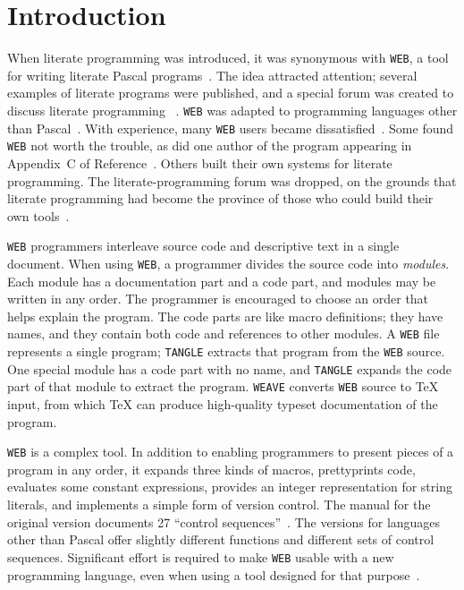 \section{Introduction}
When literate programming was
introduced, it was synonymous with {\tt WEB}, a tool
for writing literate Pascal programs~\cite[Chapter~4]{knuth:literate:book}.
The idea attracted attention; several examples of literate
programs were published, and a special forum was created to discuss literate
programming~%
\cite{denning:announcing,gries:pearls,knuth:literate:book,thimbleby:review}.
{\tt WEB} was  adapted to programming languages other than
Pascal~\cite{guntermann:cweb,levy:cweb,ramsey:building,sewell:mangle,thimbleby:cweb}.
%
With experience, many {\tt WEB} users became dissatisfied~\cite{ramsey:literate}. 
Some found {\tt WEB} not worth the trouble, as did
one author of the program appearing in Appendix~C
of Reference~.
Others built their own systems for literate
 programming.  %
The literate-programming forum was dropped, on the grounds that
literate programming had become the province of those who could build
their own tools~\cite{cvw:assessment}.

{\tt WEB}  programmers
 interleave source code and descriptive text in a single document.
When using {\tt WEB}, a programmer divides the source code into
{\em modules}.
Each module has a documentation part and a code part, and
modules may be written in any order.
The programmer is encouraged to choose an order that helps explain the program.
The code parts are like macro definitions;  they have names, and they contain
both code and references to other modules.
A {\tt WEB} file represents a single program;
{\tt TANGLE}  extracts that program from the {\tt WEB} source. 
One special module has a code part with no name, and {\tt TANGLE}
expands the code part of that module to extract the program.
{\tt WEAVE} converts {\tt WEB} source to
{\TeX} input, from which {\TeX} can produce high-quality typeset
documentation of the program.


{\tt WEB} is a complex tool.
In addition to enabling programmers to present pieces of a program in
any order, it expands three kinds of macros, prettyprints code,
evaluates some constant expressions,
provides an integer representation for string literals, and implements
a simple form of version control.
The manual for the original version documents 27 ``control sequences''~\cite{knuth:web}.
The versions for languages other than Pascal offer slightly different
functions and different sets of control sequences.
Significant effort is required to make {\tt WEB} usable with a new
programming language, even when using a tool designed for that
purpose~\cite{ramsey:building}. 

